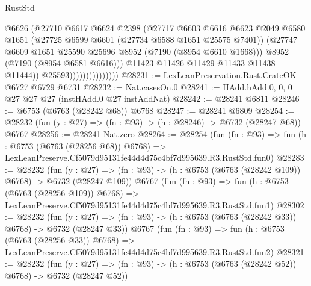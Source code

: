 \begin{lexlean}{RustStd}
\begin{coremodule}
                                    @6626
                                    (@27710
                                      @6617
                                      @6624
                                      @2398
                                      (@27717
                                        @6603
                                        @6616
                                        @6623
                                        @2049
                                        @6580
                                        @1651
                                        (@27725 @6599 @6601 (@27734 @6588 @1651 @25575 @7401))
                                        (@27747
                                          @6609
                                          @1651
                                          @25590
                                          @25696
                                          @8952
                                          (@7190 (@8954 @6610 @1668)))
                                        @8952
                                        (@7190 (@8954 @6581 @6616)))
                                      @11423
                                      @11426
                                      @11429
                                      @11433
                                      @11438
                                      @11444))
                                  @25593)))))))))))))))
@28231 := LexLeanPreservation.Rust.CrateOK @6727 @6729 @6731
@28232 := Nat.casesOn.{0}
@28241 := HAdd.hAdd.{0, 0, 0} @27 @27 @27 (instHAdd.{0} @27 instAddNat)
@28242 := @28241 @6811
@28246 := @6753 (@6763 (@28242 @68)) @6768
@28247 := @28241 @6809
@28254 := @28232 (fun (y : @27) => (fn : @93) -> (h : @28246) -> @6732 (@28247 @68)) @6767
@28256 := @28241 Nat.zero
@28264 := @28254
    (fun (fn : @93) =>
    fun (h : @6753 (@6763 (@28256 @68)) @6768) =>
    LexLeanPreserve.Cf5079d95131fe44d4d75c4bf7d995639.R3.RustStd.fun0)
@28283 := @28232
    (fun (y : @27) => (fn : @93) -> (h : @6753 (@6763 (@28242 @109)) @6768) -> @6732 (@28247 @109))
    @6767
    (fun (fn : @93) =>
    fun (h : @6753 (@6763 (@28256 @109)) @6768) =>
    LexLeanPreserve.Cf5079d95131fe44d4d75c4bf7d995639.R3.RustStd.fun1)
@28302 := @28232
    (fun (y : @27) => (fn : @93) -> (h : @6753 (@6763 (@28242 @33)) @6768) -> @6732 (@28247 @33))
    @6767
    (fun (fn : @93) =>
    fun (h : @6753 (@6763 (@28256 @33)) @6768) =>
    LexLeanPreserve.Cf5079d95131fe44d4d75c4bf7d995639.R3.RustStd.fun2)
@28321 := @28232
    (fun (y : @27) => (fn : @93) -> (h : @6753 (@6763 (@28242 @52)) @6768) -> @6732 (@28247 @52))

\end{coremodule}
\end{lexlean}
